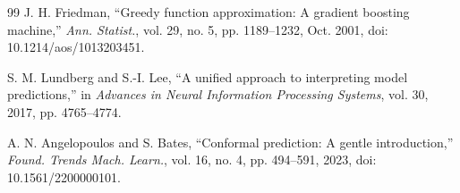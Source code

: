 \documentclass[10pt,letterpaper,twocolumn]{article}
\begin{document}
\begin{thebibliography}{99}
J. H. Friedman, ``Greedy function approximation: A gradient boosting machine,'' \emph{Ann. Statist.}, vol. 29, no. 5, pp. 1189--1232, Oct. 2001, doi: 10.1214/aos/1013203451.

S. M. Lundberg and S.-I. Lee, ``A unified approach to interpreting model predictions,'' in \emph{Advances in Neural Information Processing Systems}, vol. 30, 2017, pp. 4765--4774.

A. N. Angelopoulos and S. Bates, ``Conformal prediction: A gentle introduction,'' \emph{Found. Trends Mach. Learn.}, vol. 16, no. 4, pp. 494--591, 2023, doi: 10.1561/2200000101.

\end{thebibliography}
\end{document}
